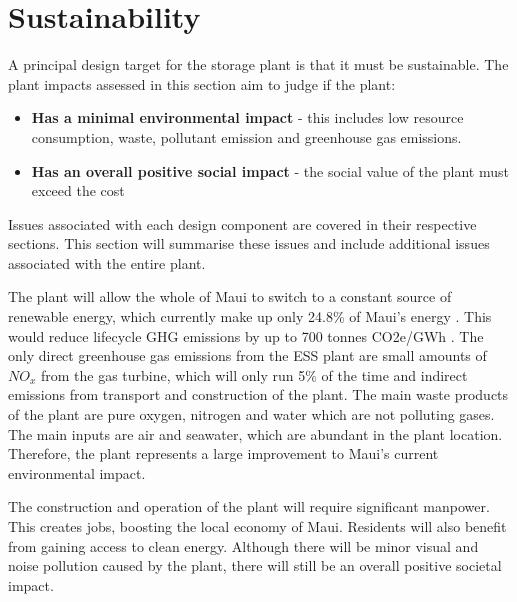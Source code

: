 


%
\section{Sustainability}

A principal design target for the storage plant is that it must be sustainable. The plant impacts assessed in this section aim to judge if the plant:
\begin{itemize}
\item \textbf{Has a minimal environmental impact} - this includes low resource consumption, waste, pollutant emission and greenhouse gas emissions.
\item \textbf{Has an overall positive social impact} - the social value of the plant must exceed the cost
\end{itemize}
Issues associated with each design component are covered in their respective sections. This section will summarise these issues and include additional issues associated with the entire plant.

The plant will allow the whole of Maui to switch to a constant source of renewable energy, which currently make up only 24.8\% of Maui's energy \cite{website:mauielectric}. This would reduce lifecycle GHG emissions by up to 700 tonnes CO2e/GWh \cite{GHG}. The only direct greenhouse gas emissions from the ESS plant are small amounts of $NO_x$ from the gas turbine, which will only run 5\% of the time and indirect emissions from transport and construction of the plant. The main waste products of the plant are pure oxygen, nitrogen and water which are not polluting gases. The main inputs are air and seawater, which are abundant in the plant location. Therefore, the plant represents a large improvement to Maui's current environmental impact.

The construction and operation of the plant will require significant manpower. This creates jobs, boosting the local economy of Maui. Residents will also benefit from gaining access to clean energy. Although there will be minor visual and noise pollution caused by the plant, there will still be an overall positive societal impact.



%